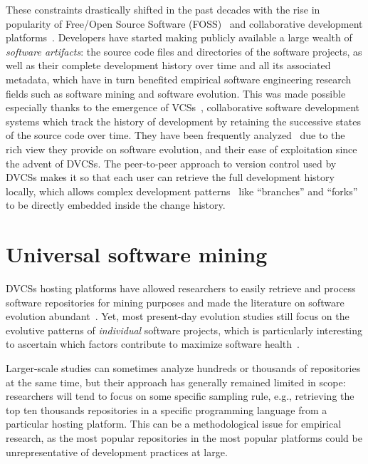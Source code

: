 These constraints drastically shifted in the past decades with the rise in
popularity of Free/Open Source Software
(FOSS)~\cite{syeed-2013-oss-evol-review} and collaborative development
platforms~\cite{dabbish2012socialcoding, kalliamvakou2014promises}. Developers
have started making publicly available a large wealth of \emph{software
artifacts}: the source code files and directories of the software projects, as
well as their complete development history over time and all its associated
metadata, which have in turn benefited empirical software engineering research
fields such as software mining and software evolution. This was made possible
especially thanks to the emergence of \glspl{VCS}~\cite{spinellis2005vcs},
collaborative software development systems which track the history of
development by retaining the successive states of the source code over time.
They have been frequently analyzed~\cite{kagdi2007msrsurvey} due to the rich
view they provide on software evolution, and their ease of exploitation since
the advent of \glspl{DVCS}. The peer-to-peer approach to version control used
by \glspl{DVCS} makes it so that each user can retrieve the full development
history locally, which allows complex development
patterns~\cite{gousios2014pullrequests,gousios2015work} like ``branches'' and
``forks'' to be directly embedded inside the change history.

\section{Universal software mining}
\label{sec:universal-software-mining}

\glspl{DVCS} hosting platforms have allowed researchers to easily retrieve and
process software repositories for mining purposes and made the literature on
software evolution abundant~\cite{herraiz2013evolution}. Yet, most present-day
evolution studies still focus on the evolutive patterns of \emph{individual}
software projects, which is particularly interesting to ascertain which factors
contribute to maximize software health~\cite{DBLP:conf/icse/2018soheal}.

Larger-scale studies can sometimes analyze hundreds or thousands of
repositories at the same time, but their approach has generally remained
limited in scope: researchers will tend to focus on some specific sampling
rule, e.g., retrieving the top ten thousands repositories in a specific
programming language from a particular hosting platform. This can be a
methodological issue for empirical research, as the most popular repositories
in the most popular platforms could be unrepresentative of development
practices at large.

